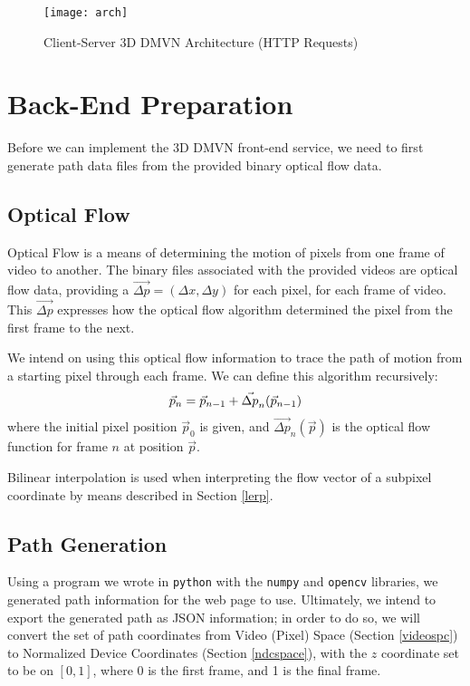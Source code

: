 \begin{figure}[h]
\centering
\texttt{[image: arch]}
\caption{Client-Server 3D DMVN Architecture (HTTP Requests)}
\end{figure}

\section{Back-End Preparation}
Before we can implement the 3D DMVN front-end service, we need to first generate path data files from the provided binary optical flow data.

\subsection{Optical Flow}
\label{opticalflow}
Optical Flow is a means of determining the motion of pixels from one frame of video to another. The binary files associated with the provided videos are optical flow data, providing a $\vec{\Delta p} = (\Delta x, \Delta y)$ for each pixel, for each frame of video. This $\vec{\Delta p}$ expresses how the optical flow algorithm determined the pixel from the first frame to the next.\cite{opticalflow}
\par We intend on using this optical flow information to trace the path of motion from a starting pixel through each frame. We can define this algorithm recursively:
\begin{equation}
    \vec{p}_n = \vec{p}_{n-1} + \vec{\Delta p}_n(\vec{p}_{n-1}) \\
\end{equation}
where the initial pixel position $\vec{p}_0$ is given, and $\vec{\Delta p}_n(\vec{p})$ is the optical flow function for frame $n$ at position $\vec{p}$.
\par Bilinear interpolation is used when interpreting the flow vector of a subpixel coordinate by means described in Section \ref{lerp}.


\subsection{Path Generation}
Using a program we wrote in \texttt{python} with the \texttt{numpy} and \texttt{opencv} libraries, we generated path information for the web page to use. Ultimately, we intend to export the generated path as JSON information; in order to do so, we will convert the set of path coordinates from Video (Pixel) Space (Section \ref{videospc}) to Normalized Device Coordinates (Section \ref{ndcspace}), with the $z$ coordinate set to be on $[0,1]$, where 0 is the first frame, and 1 is the final frame.

